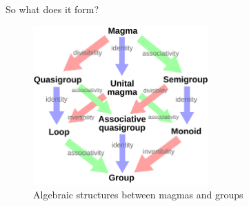 \documentclass{beamer}
\begin{document}

\begin{frame}{So what does it form?}
    \begin{figure}
        \includegraphics[width=0.6\textwidth]{images/group_theory/algebraic_structures.png}
        \caption{\label{fig:algebraic-structures-2}Algebraic structures between magmas and groups \cite{ethaniel_english_2020}}
    \end{figure}
\end{frame}
\end{document}

